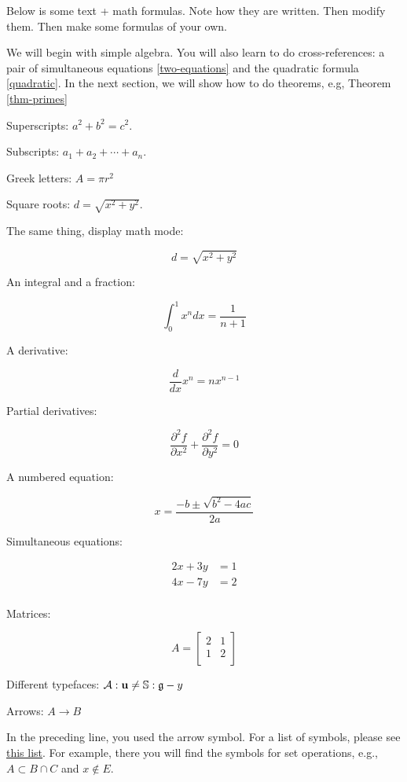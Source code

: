 Below is some text + math formulas. Note how they are written.  Then modify them.  Then make some formulas of your own.

We will begin with simple algebra. You will also learn to do cross-references: a pair of simultaneous equations \eqref{two-equations} and the quadratic formula \eqref{quadratic}.  In the next section, we will show how to do theorems, e.g, Theorem \eqref{thm-primes}

Superscripts: $a^2 + b^2 = c^2$.

Subscripts: $a_1 + a_2 + \cdots + a_n$. 

Greek letters: $A = \pi r^2$

Square roots: $d = \sqrt{x^2 + y^2}$.

The same thing, display math mode:

$$
d = \sqrt{x^2 + y^2}
$$

An integral and a fraction:

$$
\int_0^1 x^n dx = \frac{1}{n+1}
$$

A derivative:

$$
   \frac{d}{dx} x^n = n x^{n-1}
$$

Partial derivatives:

$$
\frac{\partial^2 f}{\partial x^2} + \frac{\partial^2 f}{\partial y^2}  = 0
$$

A numbered equation:

\begin{equation}
\label{quadratic}
x = \frac{- b \pm \sqrt{b^2 - 4ac}}{2a}
\end{equation}

Simultaneous equations:

\begin{align}
\label{two-equations}
2x + 3y &= 1 \\
4x - 7y &= 2 \\
\end{align}

Matrices:

$$
A =
\begin{bmatrix}
2 & 1 \\
1 & 2 \\
\end{bmatrix}
$$

Different typefaces: $\mathcal{A}:{\bf u} \not= \mathbb{S}:{\frak g} - y$

Arrows: $A \to B$

In the preceding line, you used the arrow symbol.  For a list of symbols, please see
\href{https://artofproblemsolving.com/wiki/index.php/LaTeX:Symbols}{this list}.  For example, there you will find the symbols for set operations, e.g., $A \subset B \cap C$ and $x \not\in E$.

